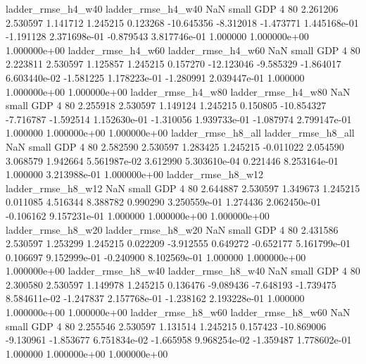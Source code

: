       ladder_rmse_h4_w40       ladder_rmse_h4_w40                   NaN      small      GDP                 4 80 2.261206       2.530597 1.141712       1.245215    0.123268    -10.645356     -8.312018    -1.473771   1.445168e-01 -1.191128 2.371698e-01    -0.879543   3.817746e-01            1.000000    1.000000e+00        1.000000e+00
      ladder_rmse_h4_w60       ladder_rmse_h4_w60                   NaN      small      GDP                 4 80 2.223811       2.530597 1.125857       1.245215    0.157270    -12.123046     -9.585329    -1.864017   6.603440e-02 -1.581225 1.178223e-01    -1.280991   2.039447e-01            1.000000    1.000000e+00        1.000000e+00
      ladder_rmse_h4_w80       ladder_rmse_h4_w80                   NaN      small      GDP                 4 80 2.255918       2.530597 1.149124       1.245215    0.150805    -10.854327     -7.716787    -1.592514   1.152630e-01 -1.310056 1.939733e-01    -1.087974   2.799147e-01            1.000000    1.000000e+00        1.000000e+00
      ladder_rmse_h8_all       ladder_rmse_h8_all                   NaN      small      GDP                 4 80 2.582590       2.530597 1.283425       1.245215   -0.011022      2.054590      3.068579     1.942664   5.561987e-02  3.612990 5.303610e-04     0.221446   8.253164e-01            1.000000    3.213988e-01        1.000000e+00
      ladder_rmse_h8_w12       ladder_rmse_h8_w12                   NaN      small      GDP                 4 80 2.644887       2.530597 1.349673       1.245215    0.011085      4.516344      8.388782     0.990290   3.250559e-01  1.274436 2.062450e-01    -0.106162   9.157231e-01            1.000000    1.000000e+00        1.000000e+00
      ladder_rmse_h8_w20       ladder_rmse_h8_w20                   NaN      small      GDP                 4 80 2.431586       2.530597 1.253299       1.245215    0.022209     -3.912555      0.649272    -0.652177   5.161799e-01  0.106697 9.152999e-01    -0.240900   8.102569e-01            1.000000    1.000000e+00        1.000000e+00
      ladder_rmse_h8_w40       ladder_rmse_h8_w40                   NaN      small      GDP                 4 80 2.300580       2.530597 1.149978       1.245215    0.136476     -9.089436     -7.648193    -1.739475   8.584611e-02 -1.247837 2.157768e-01    -1.238162   2.193228e-01            1.000000    1.000000e+00        1.000000e+00
      ladder_rmse_h8_w60       ladder_rmse_h8_w60                   NaN      small      GDP                 4 80 2.255546       2.530597 1.131514       1.245215    0.157423    -10.869006     -9.130961    -1.853677   6.751834e-02 -1.665958 9.968254e-02    -1.359487   1.778602e-01            1.000000    1.000000e+00        1.000000e+00
